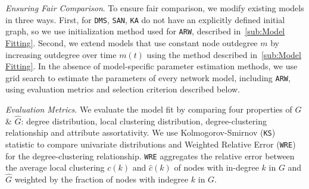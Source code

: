 \textit{Ensuring Fair Comparison}. To ensure fair comparison, we modify existing models in three ways.
First, for \texttt{DMS}, \texttt{SAN}, \texttt{KA} do not have an explicitly defined initial graph,
so we use initialization method used for \texttt{ARW}, described in~\cref{sub:Model Fitting}. Second, we extend
models that use constant node outdegree $m$ by increasing outdegree over time $m(t)$
using the method described in~\cref{sub:Model Fitting}. In the absence of model-specific parameter estimation methods,
we use grid search to estimate the parameters of every network model, including \texttt{ARW},
using evaluation metrics and selection criterion described below.

\textit{Evaluation Metrics}.
We evaluate the model fit by comparing four properties of ${G}$ \& $\hat{G}$:
degree distribution, local clustering distribution, degree-clustering relationship
and attribute assortativity. We use Kolmogorov-Smirnov (\texttt{KS}) statistic to compare univariate
distributions and Weighted Relative Error (\texttt{WRE}) for the degree-clustering relationship.
\texttt{WRE} aggregates the relative error between the average local clustering $c(k)$ and $\hat{c}(k)$ of nodes with in-degree $k$ in $G$ and $\hat{G}$ weighted by the fraction of nodes with indegree $k$ in $G$.


